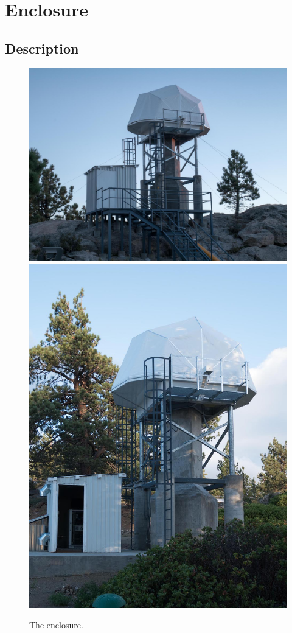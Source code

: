 \chapter{Enclosure}
\label{chapter:enclosure}

\section{Description}

\begin{figure}
\begin{center}
\ifcoatli
\includegraphics[width=0.8\linewidth]{figures/enclosure-coatli.jpg}
\fi
\ifddoti
\includegraphics[width=0.8\linewidth]{figures/enclosure-ddoti.jpg}
\fi
\end{center}
\caption{The {\projectname} enclosure.}
\label{figure:enclosure}
\end{figure}


